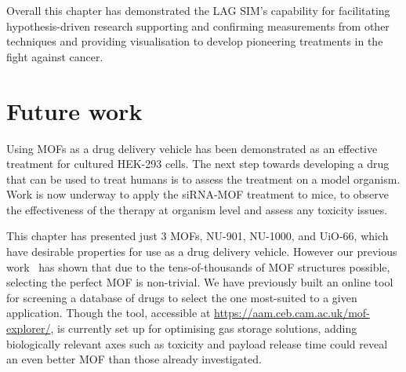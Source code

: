 Overall this chapter has demonstrated the LAG SIM's capability for facilitating hypothesis-driven research supporting and confirming measurements from other techniques and providing visualisation to develop pioneering treatments in the fight against cancer. 

\section{Future work}
Using MOFs as a drug delivery vehicle has been demonstrated as an effective treatment for cultured HEK-293 cells. 
The next step towards developing a drug that can be used to treat humans is to assess the treatment on a model organism. 
Work is now underway to apply the siRNA-MOF treatment to mice, to observe the effectiveness of the therapy at organism level and assess any toxicity issues. 

This chapter has presented just 3 MOFs, NU-901, NU-1000, and UiO-66, which have desirable properties for use as a drug delivery vehicle. 
However our previous work~\cite{meee} has shown that due to the tens-of-thousands of MOF structures possible, selecting the perfect MOF is non-trivial. 
We have previously built an online tool for screening a database of drugs to select the one most-suited to a given application. 
Though the tool, accessible at \url{https://aam.ceb.cam.ac.uk/mof-explorer/}, is currently set up for optimising gas storage solutions, adding biologically relevant axes such as toxicity and payload release time could reveal an even better MOF than those already investigated. 